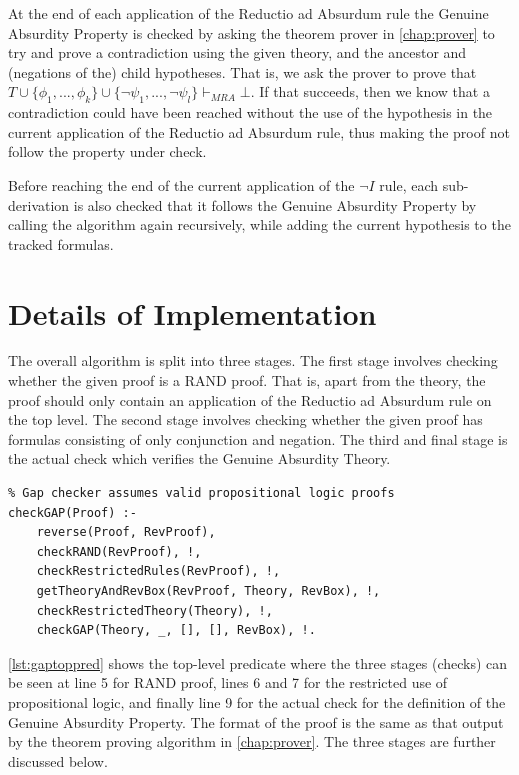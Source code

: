 \documentclass[11pt,twoside,a4paper]{report}
\begin{document}
At the end of each application of the Reductio ad Absurdum rule the Genuine Absurdity Property is checked by asking the theorem prover in \autoref{chap:prover} to try and prove a contradiction using the given theory, and the ancestor and (negations of the) child hypotheses. That is, we ask the prover to prove that $T\cup\{\phi_1, ..., \phi_k\}\cup\{\neg\psi_1, ..., \neg\psi_l\}\vdash_{MRA}\bot$. If that succeeds, then we know that a contradiction could have been reached without the use of the hypothesis in the current application of the Reductio ad Absurdum rule, thus making the proof not follow the property under check.

Before reaching the end of the current application of the $\neg I$ rule, each sub-derivation is also checked that it follows the Genuine Absurdity Property by calling the algorithm again recursively, while adding the current hypothesis to the tracked formulas.

\section{Details of Implementation}
The overall algorithm is split into three stages. The first stage involves checking whether the given proof is a RAND proof. That is, apart from the theory, the proof should only contain an application of the Reductio ad Absurdum rule on the top level. The second stage involves checking whether the given proof has formulas consisting of only conjunction and negation. The third and final stage is the actual check which verifies the Genuine Absurdity Theory.

\begin{lstlisting}[caption={Genuine Absurdity Property top level predicate},label=lst:gaptoppred]
% Checks that the given proof follows the GAP property
% Gap checker assumes valid propositional logic proofs
checkGAP(Proof) :- 
	reverse(Proof, RevProof), 
	checkRAND(RevProof), !,
	checkRestrictedRules(RevProof), !,
	getTheoryAndRevBox(RevProof, Theory, RevBox), !,
	checkRestrictedTheory(Theory), !,
	checkGAP(Theory, _, [], [], RevBox), !.
\end{lstlisting}

\autoref{lst:gaptoppred} shows the top-level predicate where the three stages (checks) can be seen at line 5 for RAND proof, lines 6 and 7 for the restricted use of propositional logic, and finally line 9 for the actual check for the definition of the Genuine Absurdity Property. The format of the proof is the same as that output by the theorem proving algorithm in \autoref{chap:prover}. The three stages are further discussed below.
\end{document}
